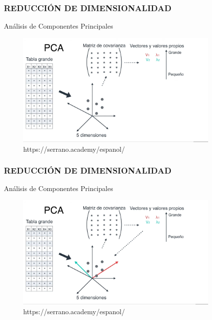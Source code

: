 \documentclass{beamer}
\begin{document}
\begin{frame}
	\frametitle{REDUCCIÓN DE DIMENSIONALIDAD}
	\begin{block}{Análisis de Componentes Principales}	
		\begin{figure}
			\includegraphics[width=0.9\textwidth]{PCA/IMG_3591.jpg}
			\caption{https://serrano.academy/espanol/}
		\end{figure}
	\end{block}
\end{frame}

\begin{frame}
	\frametitle{REDUCCIÓN DE DIMENSIONALIDAD}
	\begin{block}{Análisis de Componentes Principales}	
		\begin{figure}
			\includegraphics[width=0.9\textwidth]{PCA/IMG_3592.jpg}
			\caption{https://serrano.academy/espanol/}
		\end{figure}
	\end{block}
\end{frame}
\end{document}
